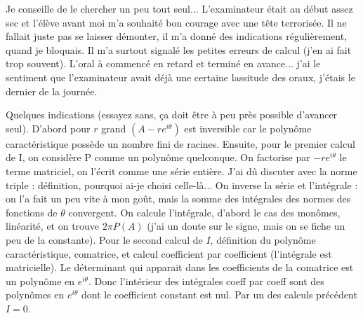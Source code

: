 \documentclass[french,a4paper, 12pt]{article}
\begin{document}
Je conseille de le chercher un peu tout seul... L'examinateur était au début assez sec et l'élève avant moi m'a souhaité bon courage avec une tête terrorisée. Il ne fallait juste pas se laisser démonter, il m'a donné des indications régulièrement, quand je bloquais. Il m'a surtout signalé les petites erreurs de calcul (j'en ai fait trop souvent). L'oral à commencé en retard et terminé en avance... j'ai le sentiment que l'examinateur avait déjà une certaine lassitude des oraux, j'étais le dernier de la journée.

Quelques indications (essayez sans, ça doit être à peu près possible d'avancer seul). D'abord pour $r$ grand $(A - re^{i\theta})$ est inversible car le polynôme caractéristique possède un nombre fini de racines. Ensuite, pour le premier calcul de I, on considère P comme un polynôme quelconque. On factorise par $-re^{i\theta}$ le terme matriciel, on l'écrit comme une série entière. J'ai dû discuter avec la norme triple : définition, pourquoi ai-je choisi celle-là... On inverse la série et l'intégrale : on l'a fait un peu vite à mon goût, mais la somme des intégrales des normes des fonctions de $\theta$ convergent. On calcule l'intégrale, d'abord le cas des monômes, linéarité, et on trouve $2\pi P(A)$ (j'ai un doute sur le signe, mais on se fiche un peu de la constante). Pour le second calcul de $I$, définition du polynôme caractéristique, comatrice, et calcul coefficient par coefficient (l'intégrale est matricielle). Le déterminant qui apparait dans les coefficients de la comatrice est un polynôme en $e^{i\theta}$. Donc l'intérieur des intégrales coeff par coeff sont des polynômes en $e^{i\theta}$ dont le coefficient constant est nul. Par un des calculs précédent $I = 0$.
\end{document}
